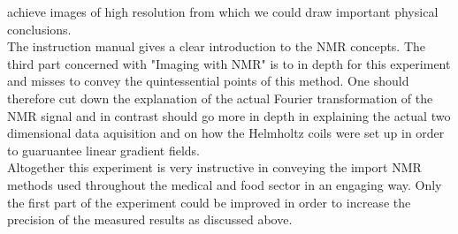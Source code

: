 achieve images of high resolution from which we could draw important physical conclusions.\\
The instruction manual \cite{manual} gives a clear introduction to the NMR concepts. The third part concerned with "Imaging with NMR" is to in depth for this experiment and misses to convey the quintessential points of this method. One should therefore cut down the explanation of the actual Fourier transformation of the NMR signal and in contrast should go more in depth in explaining the actual two dimensional data aquisition and on how the Helmholtz coils were set up in order to guaruantee linear gradient fields.
\\
Altogether this experiment is very instructive in conveying the import NMR methods used throughout the medical and food sector in an engaging way. Only the first part of the experiment could be improved in order to increase the precision of the measured results as discussed above.